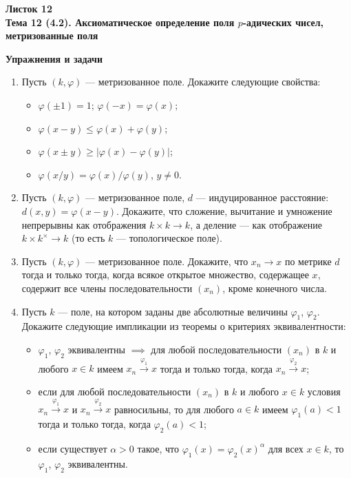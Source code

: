 \documentclass[a4paper, 11pt]{article}
\begin{document}
\begin{center} \Large \bf Листок 12\\ Тема 12 (4.2). Аксиоматическое определение поля $p$-адических чисел, метризованные поля \end{center}

\noindent\textbf{Упражнения и задачи}
\begin{enumerate}[topsep=0pt]

    \item Пусть $(k,\varphi)$ --- метризованное поле. Докажите следующие свойства:
    \begin{itemize}[topsep=0pt]
        \item $\varphi(\pm 1)=1$; $\varphi (-x) = \varphi (x)$;
        \item $\varphi (x - y) \leqslant \varphi(x) + \varphi(y)$;
        \item $\varphi(x \pm y) \geqslant |\varphi(x) - \varphi(y)|$;
        \item $\varphi(x/y) = \varphi(x)/\varphi(y)$, $y \neq 0$.
    \end{itemize}

    \item Пусть $(k,\varphi)$ --- метризованное поле, $d$ --- индуцированное расстояние: $d(x,y) = \varphi(x-y)$. Докажите, что сложение, вычитание и умножение непрерывны как отображения $k\times k\to k$, а деление --- как отображение $k\times k^\times\to k$ (то есть $k$ --- топологическое поле).

    \item Пусть $(k,\varphi)$ --- метризованное поле. Докажите, что $x_n\to x$ по метрике $d$ тогда и только тогда, когда всякое открытое множество, содержащее $x$, содержит все члены последовательности $(x_n)$, кроме конечного числа.
    
    \item Пусть $k$ --- поле, на котором заданы две абсолютные величины $\varphi_1$, $\varphi_2$. Докажите следующие импликации из теоремы о критериях эквивалентности:
    \begin{itemize}[topsep=0pt]
        \item $\varphi_1$, $\varphi_2$ эквивалентны $\implies$ для любой последовательности $(x_n)$ в $k$ и любого $x\in k$ имеем $x_n\xrightarrow{\varphi_1}x$ тогда и только тогда, когда
        $x_n\xrightarrow{\varphi_2}x$;
        \item если для любой последовательности $(x_n)$ в $k$ и любого $x\in k$ условия $x_n\xrightarrow{\varphi_1}x$ и $x_n\xrightarrow{\varphi_2}x$ равносильны, то для любого $a\in k$ имеем $\varphi_1(a)<1$ тогда и только тогда, когда $\varphi_2(a)<1$;
        \item если существует $\alpha>0$ такое, что $\varphi_1(x)=\varphi_2(x)^\alpha$ для всех $x\in k$, то $\varphi_1$, $\varphi_2$ эквивалентны.
    \end{itemize}


\end{enumerate}
\end{document}
